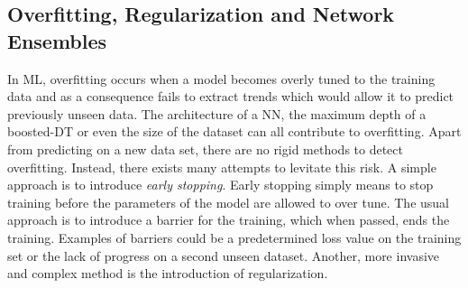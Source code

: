 \subsection{Overfitting, Regularization and Network Ensembles}
In \ac{ML}, overfitting occurs when a model becomes overly tuned to the training data and as a consequence 
fails to extract trends which would allow it to predict previously unseen data. The architecture of a \ac{NN}, 
the maximum depth of a boosted-\ac{DT} or even the size of the dataset can all contribute to overfitting. Apart 
from predicting on a new data set, there are no rigid methods to detect overfitting. Instead, there exists many 
attempts to levitate this risk. A simple approach is to introduce \emph{early stopping}. Early stopping simply 
means to stop training before the parameters of the model are allowed to over tune. The usual approach 
is to introduce a barrier for the training, which when passed, ends the training. Examples of barriers could be a 
predetermined loss value on the training set or the lack of progress on a second unseen dataset. Another, more
invasive and complex method is the introduction of regularization. 









